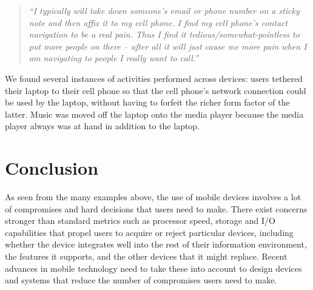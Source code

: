 \documentclass[twocolumn,final,10pt]{article}
\begin{document}
\begin{quotation}
\textit{
``I typically will take down someone's email or phone number on a sticky note and then affix it to my cell phone. I find my cell phone's contact navigation to be a real pain. Thus I find it tedious/somewhat-pointless to put more people on there -- after all it will just cause me more pain when I am navigating to people I really want to call.''
}
\end{quotation}

We found several instances of activities performed across devices: users tethered their laptop to their cell phone so that the cell phone's network connection could be used by the laptop, without having to forfeit the richer form factor of the latter. Music was moved off the laptop onto the media player because the media player always was at hand in addition to the laptop.

\section{Conclusion}

As seen from the many examples above, the use of mobile devices involves a lot of compromises and hard decisions that users need to make. There exist concerns stronger than standard metrics such as processor speed, storage and I/O capabilities that propel users to acquire or reject particular devices, including whether the device integrates well into the rest of their information environment, the features it supports, and the other devices that it might replace. Recent advances in mobile technology need to take these into account to design devices and systems that reduce the number of compromises users need to make.
\end{document}

